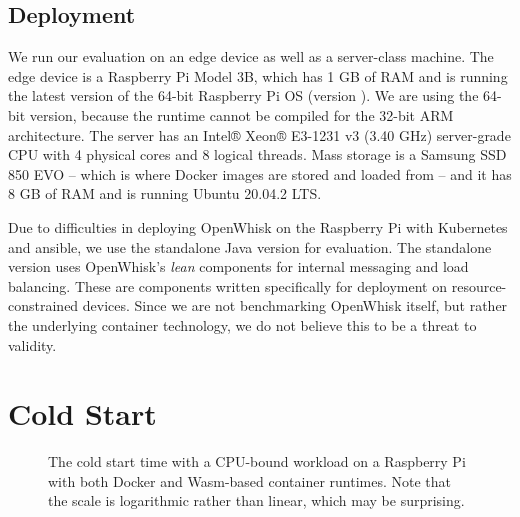 \subsection{Deployment}

We run our evaluation on an edge device as well as a  server-class machine. The edge device is a Raspberry Pi Model 3B, which has 1 GB of RAM and is running the latest version of the 64-bit Raspberry Pi OS (version ). We are using the 64-bit version, because the  runtime cannot be compiled for the 32-bit ARM architecture. The server has an Intel® Xeon® E3-1231 v3 (3.40 GHz) server-grade CPU with 4 physical cores and 8 logical threads. Mass storage is a Samsung SSD 850 EVO -- which is where Docker images are stored and loaded from -- and it has 8 GB of RAM and is running Ubuntu 20.04.2 LTS.

Due to difficulties in deploying OpenWhisk on the Raspberry Pi with Kubernetes and ansible, we use the standalone Java version for evaluation. The standalone version uses OpenWhisk's \emph{lean} components for internal messaging and load balancing. These are components written specifically for deployment on resource-constrained devices. Since we are not benchmarking OpenWhisk itself, but rather the underlying container technology, we do not believe this to be a threat to validity.

\section{Cold Start}

\begin{figure}
    \begin{center}
        
    \end{center}
    \caption{The cold start time with a CPU-bound workload on a Raspberry Pi with both Docker and Wasm-based container runtimes. Note that the scale is logarithmic rather than linear, which may be surprising.}
    \label{fig:pi-cold-start-hash}
\end{figure}

